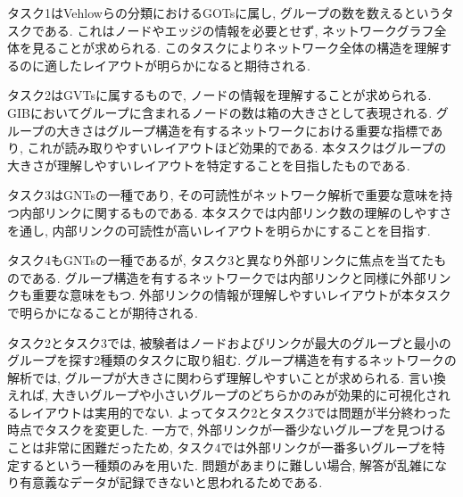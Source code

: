 \documentclass{kuee}
\begin{document}
タスク1はVehlowらの分類におけるGOTsに属し, グループの数を数えるというタスクである.
これはノードやエッジの情報を必要とせず, ネットワークグラフ全体を見ることが求められる.
このタスクによりネットワーク全体の構造を理解するのに適したレイアウトが明らかになると期待される.

タスク2はGVTsに属するもので, ノードの情報を理解することが求められる.
GIBにおいてグループに含まれるノードの数は箱の大きさとして表現される.
グループの大きさはグループ構造を有するネットワークにおける重要な指標であり, これが読み取りやすいレイアウトほど効果的である.
本タスクはグループの大きさが理解しやすいレイアウトを特定することを目指したものである.

タスク3はGNTsの一種であり, その可読性がネットワーク解析で重要な意味を持つ内部リンクに関するものである.
本タスクでは内部リンク数の理解のしやすさを通し, 内部リンクの可読性が高いレイアウトを明らかにすることを目指す.

タスク4もGNTsの一種であるが, タスク3と異なり外部リンクに焦点を当てたものである.
グループ構造を有するネットワークでは内部リンクと同様に外部リンクも重要な意味をもつ.
外部リンクの情報が理解しやすいレイアウトが本タスクで明らかになることが期待される.

タスク2とタスク3では, 被験者はノードおよびリンクが最大のグループと最小のグループを探す2種類のタスクに取り組む.
グループ構造を有するネットワークの解析では, グループが大きさに関わらず理解しやすいことが求められる.
言い換えれば, 大きいグループや小さいグループのどちらかのみが効果的に可視化されるレイアウトは実用的でない.
よってタスク2とタスク3では問題が半分終わった時点でタスクを変更した.
一方で, 外部リンクが一番少ないグループを見つけることは非常に困難だったため, タスク4では外部リンクが一番多いグループを特定するという一種類のみを用いた.
問題があまりに難しい場合, 解答が乱雑になり有意義なデータが記録できないと思われるためである.
\end{document}
